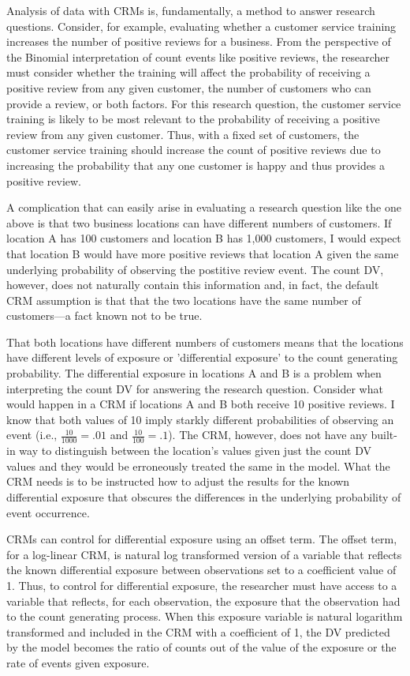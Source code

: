 \documentclass[ShortAfour,times,sageapa]{sagej}
\begin{document}
	Analysis of data with CRMs is, fundamentally, a method to answer research questions.
	Consider, for example, evaluating whether a customer service training increases the number of positive reviews for a business.
	From the perspective of the Binomial interpretation of count events like positive reviews, the researcher must consider whether the training will affect the probability of receiving a positive review from any given customer, the number of customers who can provide a review, or both factors.
	For this research question, the customer service training is likely to be most relevant to the probability of receiving a positive review from any given customer.
	Thus, with a fixed set of customers, the customer service training should increase the count of positive reviews due to increasing the probability that any one customer is happy and thus provides a positive review.
	
	A complication that can easily arise in evaluating a research question like the one above is that two business locations can have different numbers of customers.
	If location A has 100 customers and location B has 1,000 customers, I would expect that location B would have more positive reviews that location A given the same underlying probability of observing the postitive review event.	
	The count DV, however, does not naturally contain this information and, in fact, the default CRM assumption is that that the two locations have the same number of customers---a fact known not to be true.
	
	That both locations have different numbers of customers means that the locations have different levels of exposure or 'differential exposure' to the count generating probability. 
	The differential exposure in locations A and B is a problem when interpreting the count DV for answering the research question. 
	Consider what would happen in a CRM if locations A and B both receive 10 positive reviews.
	I know that both values of 10 imply starkly different probabilities of observing an event (i.e., $\frac{10}{1000} = .01$ and $\frac{10}{100} = .1$).
	The CRM, however, does not have any built-in way to distinguish between the location's values given just the count DV values and they would be erroneously treated the same in the model.
	What the CRM needs is to be instructed how to adjust the results for the known differential exposure that obscures the differences in the underlying probability of event occurrence.
	
	CRMs can control for differential exposure using an offset term.  
	The offset term, for a log-linear CRM, is natural log transformed version of a variable that reflects the known differential exposure between observations set to a coefficient value of 1.
	Thus, to control for differential exposure, the researcher must have access to a variable that reflects, for each observation, the exposure that the observation had to the count generating process.
	When this exposure variable is natural logarithm transformed and included in the CRM with a coefficient of 1, the DV predicted by the model becomes the ratio of counts out of the value of the exposure or the rate of events given exposure.
	
\end{document}
